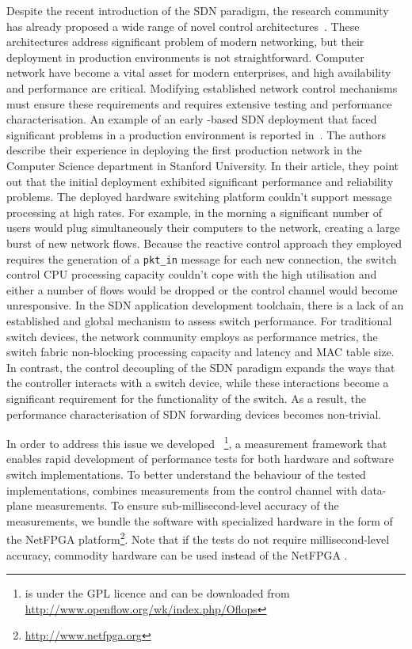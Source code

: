 Despite the recent introduction of the SDN paradigm, the research community has
already proposed a wide range of novel control architectures~\cite{plug_n_serv,
  difane,flowvisor-osdi}. These architectures address significant problem of
modern networking, but their deployment in production environments is not
straightforward.  Computer network have become a vital asset for modern
enterprises, and high availability and performance are critical. Modifying
established network control mechanisms must ensure these requirements and
requires extensive testing and performance characterisation.  An example of an
early \of-based SDN deployment that faced significant problems in a production
environment is reported in~\cite{Weissmann:va}. The authors describe their
experience in deploying the first \of production network in the Computer Science
department in Stanford University. In their article, they point out that the
initial deployment exhibited significant performance and reliability problems.
The deployed hardware switching platform couldn't support \of message processing
at high rates. For example, in the morning a significant number of users would
plug simultaneously their computers to the network, creating a large burst of
new network flows. Because the reactive control approach they employed requires
the generation of a {\tt pkt\_in} message for each new connection, the switch
control CPU processing capacity couldn't cope with the high utilisation and
either a number of flows would be dropped or the control channel would become
unresponsive. In the SDN application development toolchain, there is a lack of
an established and global mechanism to assess switch performance.  For
traditional switch devices, the network community employs as performance
metrics, the switch fabric non-blocking processing capacity and latency and MAC
table size. In contrast, the control decoupling of the SDN paradigm expands the
ways that the controller interacts with a switch device, while these
interactions become a significant requirement for the functionality of the
switch. As a result, the performance characterisation of SDN forwarding devices
becomes non-trivial. 

In order to address this issue we developed \oflops~\footnote{\oflops is under
  the GPL licence and can be downloaded from
  \url{http://www.openflow.org/wk/index.php/Oflops}}, a measurement framework
that enables rapid development of performance tests for both hardware and
software \of switch implementations. To better understand the behaviour of the
tested \of implementations, \oflops combines measurements from the \of control
channel with data-plane measurements. To ensure sub-millisecond-level accuracy
of the measurements, we bundle the \oflops software with specialized hardware in
the form of the NetFPGA platform\footnote{\url{http://www.netfpga.org}}.  Note
that if the tests do not require millisecond-level accuracy, commodity hardware
can be used instead of the NetFPGA \cite{pam-accuracy}.

